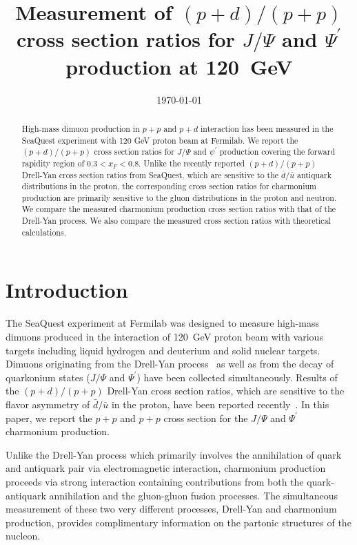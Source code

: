 \documentclass[twocolumn,aps,unsortedaddress,superscriptaddress,prd,floatfix,showpacs,linenumbers]{revtex4-2}
\begin{document}
\title{Measurement of $(p+d) / (p+p)$ cross section ratios for
	$J/\Psi$ and $\Psi^\prime$ production at \SI{120}{\GeV}}


\date{\today}
\begin{abstract}
	High-mass dimuon production in $p+p$ and $p+d$ interaction has been measured
	in the SeaQuest experiment with 120 GeV proton beam at Fermilab.
	We report the $(p+d) / (p+p)$ cross section
	ratios for $J/\Psi$ and $\psi^\prime$ production covering the forward
	rapidity region of $0.3 < x_F <0.8$. Unlike the recently reported
	$(p+d) / (p+p)$ Drell-Yan cross section ratios from SeaQuest, which are
	sensitive to the
	$\bar d / \bar u$ antiquark distributions in the proton, the corresponding
	cross section ratios for charmonium production are primarily
	sensitive to the gluon
	distributions in the proton and neutron. We compare the measured
	charmonium production cross section ratios with that of the
	Drell-Yan process. We also compare the measured cross section ratios with
	theoretical calculations.

\end{abstract}


\maketitle
\section{Introduction}
The SeaQuest experiment at Fermilab was designed to measure high-mass dimuons
produced in the interaction of \SI{120}{\GeV} proton beam with various targets
including liquid hydrogen and deuterium and solid nuclear targets. Dimuons
originating from the Drell-Yan process~\cite{drell1970} as well as from the decay of quarkonium
states ($J/\Psi$ and $\Psi^\prime$) have been collected simultaneously. 
Results of the $(p+d) / (p+p)$ Drell-Yan cross section ratios, which are sensitive
to the flavor asymmetry of $\bar d / \bar u$ in the proton, have been reported
recently~\cite{dove2021,dove2023}. In this paper, we report the 
$p+p$ and $p+p$ cross section for the $J/\Psi$ and $\Psi^\prime$ charmonium production.

Unlike the Drell-Yan process which primarily involves the annihilation 
of quark and antiquark pair via electromagnetic interaction, charmonium
production proceeds via strong interaction containing contributions from
both the quark-antiquark annihilation and the gluon-gluon
fusion processes. The simultaneous measurement of these two very different
processes, Drell-Yan and charmonium production, provides complimentary
information on the partonic structures of the nucleon.
\end{document}
